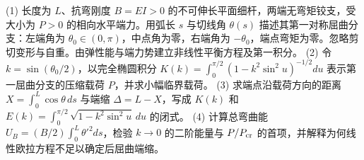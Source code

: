 (1) 长度为 \(L\)、抗弯刚度 \(B=EI>0\) 的不可伸长平面细杆，两端无弯矩铰支，受大小为 \(P>0\) 的相向水平端力。用弧长 \(s\) 与切线角 \(\theta(s)\) 描述其第一对称屈曲分支：左端角为 \(\theta_0\in(0,\pi)\)，中点角为零，右端角为 \(-\theta_0\)，端点弯矩为零。忽略剪切变形与自重。由弹性能与端力势建立非线性平衡方程及第一积分。
(2) 令 \(k=\sin(\theta_0/2)\)，以完全椭圆积分 \(K(k)=\int_0^{\pi/2}(1-k^2\sin^2u)^{-1/2}du\) 表示第一屈曲分支的压缩载荷 \(P\)，并求小幅临界载荷。
(3) 求端点沿载荷方向的距离 \(X=\int_0^L\cos\theta\,ds\) 与端缩 \(\Delta=L-X\)，写成 \(K(k)\) 和 \(E(k)=\int_0^{\pi/2}\sqrt{1-k^2\sin^2u}\,du\) 的闭式。
(4) 计算总弯曲能 \(U_B=(B/2)\int_0^L\theta'^2ds\)，检验 \(k\to0\) 的二阶能量与 \(P/P_{\rm cr}\) 的首项，并解释为何线性欧拉方程不足以确定后屈曲端缩。
